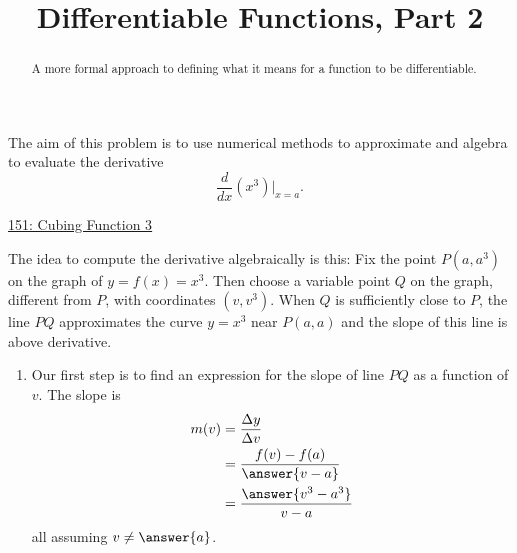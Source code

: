 \documentclass{ximera}
\title{Differentiable Functions, Part 2}
\begin{document}
\begin{abstract}
A more formal approach to defining what it means for a function to be differentiable.
\end{abstract}
\maketitle


\begin{exploration}   \label{Expdsfdsftttehh030}
The aim of this problem is to use numerical methods to approximate and algebra to evaluate the derivative
\[
   \frac{d}{dx}\left( x^3 \right) \Big|_{x=a}.
\]

\begin{onlineOnly}
    \begin{center}
\end{center}
\end{onlineOnly}

\href{https://www.desmos.com/calculator/8eiffwbgt5}{151: Cubing Function 3}


The idea to compute the derivative algebraically is this: Fix the point $P(a,a^3)$ on the graph of $y=f(x)=x^3$. Then choose a variable point $Q$ on the graph, different from $P$, with coordinates $(v,v^3)$. When $Q$ is sufficiently close to $P$, the line $PQ$ approximates the curve $y=x^3$ near $P(a,a)$ and the slope of this line is above derivative. 

\begin{enumerate}
\item Our first step is to find an expression for the slope of line $PQ$ as a function of $v$. The slope is
\begin{align*}
        m(v) &= \frac{\Delta y}{\Delta v}  \\
                & = \frac{f(v) - f(a)}{\answer{v-a}} \\
                & = \frac{\answer{v^3-a^3}}{v-a} \\
\end{align*}
all assuming $v\neq \answer{a}$.



\end{enumerate}
\end{exploration}
\end{document}
